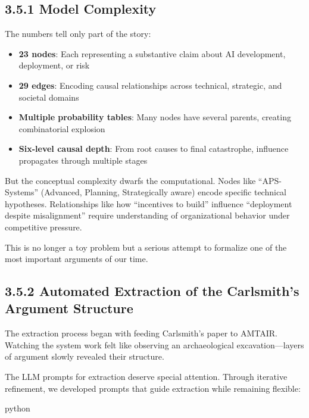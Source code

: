 \documentclass[
  11pt,
  letterpaper,
]{book}
\providecommand{\tightlist}{%
  \setlength{\itemsep}{0pt}\setlength{\parskip}{0pt}}
\begin{document}
\subsection{3.5.1 Model Complexity}\label{sec-carlsmith-complexity}

The numbers tell only part of the story:

\begin{itemize}
\tightlist
\item
  \textbf{23 nodes}: Each representing a substantive claim about AI
  development, deployment, or risk
\item
  \textbf{29 edges}: Encoding causal relationships across technical,
  strategic, and societal domains
\item
  \textbf{Multiple probability tables}: Many nodes have several parents,
  creating combinatorial explosion
\item
  \textbf{Six-level causal depth}: From root causes to final
  catastrophe, influence propagates through multiple stages
\end{itemize}

But the conceptual complexity dwarfs the computational. Nodes like
``APS-Systems'' (Advanced, Planning, Strategically aware) encode
specific technical hypotheses. Relationships like how ``incentives to
build'' influence ``deployment despite misalignment'' require
understanding of organizational behavior under competitive pressure.

This is no longer a toy problem but a serious attempt to formalize one
of the most important arguments of our time.

\subsection{3.5.2 Automated Extraction of the Carlsmith's Argument
Structure}\label{sec-carlsmith-extraction}

The extraction process began with feeding Carlsmith's paper to AMTAIR.
Watching the system work felt like observing an archaeological
excavation---layers of argument slowly revealed their structure.

The LLM prompts for extraction deserve special attention. Through
iterative refinement, we developed prompts that guide extraction while
remaining flexible:

python
\end{document}

